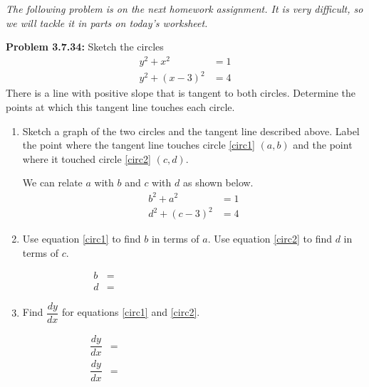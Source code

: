 \documentclass[11pt]{article}
\begin{document}
\drawtitle

\noindent \textit{The following problem is on the next homework assignment.  It
  is very difficult, so we will tackle it in parts on today's
  worksheet.}

\noindent \textbf{Problem 3.7.34:} Sketch the circles
\begin{align*}
  y^2+x^2 &= 1\\
  y^2 + (x-3)^2 & = 4
\end{align*}
There is a line with positive slope that is tangent to both circles.
Determine the points at which this tangent line touches each circle.

\begin{enumerate}
\item Sketch a graph of the two circles and the tangent line described
  above.  Label the point where the tangent line touches circle
  \ref{circ1} $(a,b)$ and the point where it touched circle
  \ref{circ2} $(c,d)$.
  
  \vfill 
  
  We can relate $a$ with $b$ and $c$ with $d$ as shown below.
  \begin{align}
    \label{circ1}
    b^2+a^2 &= 1\\
    \label{circ2}
    d^2 + (c-3)^2 & = 4
  \end{align}
  
  \newpage
  
\item Use equation \ref{circ1} to find $b$ in terms of $a$. Use
  equation \ref{circ2} to find $d$ in terms of $c$.
  
  \vfill
  \begin{align}
    \label{ba}
    b &= \hspace{3in}\\ 
    \label{dc}
    d &= \hspace{3in}
  \end{align}
  
\item Find $\dfrac{dy}{dx}$ for equations \ref{circ1} and \ref{circ2}.
  
  \vfill
  
  \begin{align}
    \label{slope1}
    \dfrac{dy}{dx} &= \hspace{3in}\\ 
    \label{slope2}
    \dfrac{dy}{dx} &= \hspace{3in}
  \end{align}
  

\end{enumerate}
\end{document}
